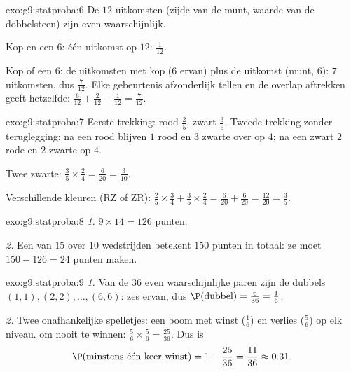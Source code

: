 \begin{solution}{exo:g9:statproba:6}
De $12$ uitkomsten (zijde van de munt, waarde van de dobbelsteen) zijn even
waarschijnlijk.

Kop en een $6$: één uitkomst op $12$: $\frac{1}{12}$.

Kop of een $6$: de uitkomsten met kop ($6$ ervan) plus de uitkomst (munt, $6$):
$7$ uitkomsten, dus $\frac{7}{12}$. Elke gebeurtenis afzonderlijk tellen en de
overlap aftrekken geeft hetzelfde:
$\frac{6}{12} + \frac{2}{12} - \frac{1}{12} = \frac{7}{12}$.
\end{solution}

\begin{solution}{exo:g9:statproba:7}
Eerste trekking: rood $\frac25$, zwart $\frac35$. Tweede trekking zonder
teruglegging: na een rood blijven $1$ rood en $3$ zwarte over op $4$; na een zwart
$2$ rode en $2$ zwarte op $4$.

Twee zwarte: $\frac35 \times \frac24 = \frac{6}{20} = \frac{3}{10}$.

Verschillende kleuren (RZ of ZR):
$\frac25 \times \frac34 + \frac35 \times \frac24
= \frac{6}{20} + \frac{6}{20} = \frac{12}{20} = \frac35$.
\end{solution}

\begin{solution}{exo:g9:statproba:8}
\emph{1.} $9 \times 14 = 126$ punten.

\emph{2.} Een  van $15$ over $10$ wedstrijden betekent $150$ punten in
totaal: ze moet $150 - 126 = 24$ punten maken.
\end{solution}

\begin{solution}{exo:g9:statproba:9}
\emph{1.} Van de $36$ even waarschijnlijke paren zijn de dubbels
$(1,1), (2,2), \dots, (6,6)$: zes ervan, dus
$\P(\text{dubbel}) = \frac{6}{36} = \frac16$.

\emph{2.} Twee onafhankelijke spelletjes: een boom met winst ($\frac16$) en verlies
($\frac56$) op elk niveau.  om nooit te winnen:
$\frac56 \times \frac56 = \frac{25}{36}$. Dus is
\[
\P(\text{minstens één keer winst}) = 1 - \frac{25}{36} = \frac{11}{36}
\approx 0.31 .
\]
\end{solution}

